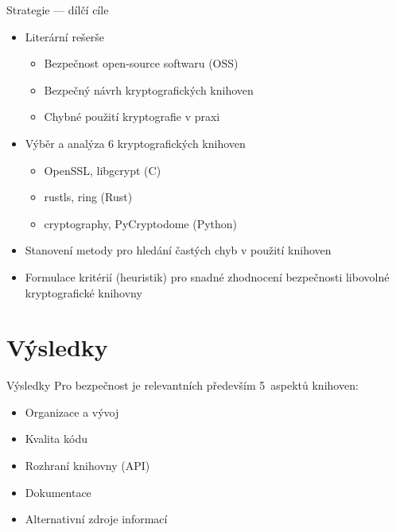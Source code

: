 \documentclass{beamer}
\newenvironment{spaceditemize}[1][1em]
{ \begin{itemize}
    \setlength{\itemsep}{#1}
}{ \end{itemize} }
\begin{document}
\begin{frame}{Strategie --- dílčí cíle}
    \begin{spaceditemize}
        \item Literární rešerše
        \begin{itemize}
            \item Bezpečnost open-source softwaru (OSS)
            \item Bezpečný návrh kryptografických knihoven
            \item Chybné použití kryptografie v praxi
        \end{itemize} 
        
        \item Výběr a analýza 6 kryptografických knihoven
        \begin{itemize}
            \item OpenSSL, libgcrypt (C)
            \item rustls, ring (Rust)
            \item cryptography, PyCryptodome (Python)
        \end{itemize}

        \item Stanovení metody pro hledání častých chyb v použití knihoven
        
        \item Formulace kritérií (heuristik) pro snadné zhodnocení bezpečnosti libovolné kryptografické knihovny
    \end{spaceditemize}
\end{frame}

\section{Výsledky}

\begin{frame}{Výsledky}
    Pro bezpečnost je relevantních především 5~aspektů knihoven:
    \vspace{1em}
    \begin{spaceditemize}
        \item Organizace a vývoj
        \item Kvalita kódu
        \item Rozhraní knihovny (API)
        \item Dokumentace
        \item Alternativní zdroje informací
    \end{spaceditemize}
\end{frame}
\end{document}
